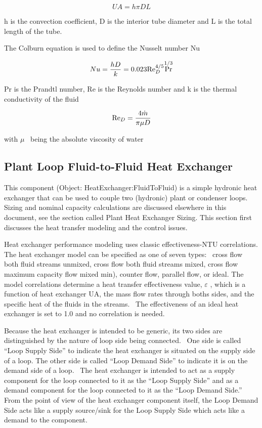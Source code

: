 \begin{equation}
UA = h\pi DL
\end{equation}

h is the convection coefficient, D is the interior tube diameter and L is the total length of the tube.

The Colburn equation is used to define the Nusselt number Nu

\begin{equation}
Nu = \frac{{hD}}{k} = 0.023{\mathop{\rm Re}\nolimits} {{}_D^{4/5}}{\Pr ^{1/3}}
\end{equation}

Pr is the Prandtl number, Re is the Reynolds number and k is the thermal conductivity of the fluid

\begin{equation}
{\mathop{\rm Re}\nolimits} {}_D = \frac{{4\dot m}}{{\pi \mu D}}
\end{equation}

with \(\mu\) ~being the absolute viscosity of water

\subsection{Plant Loop Fluid-to-Fluid Heat Exchanger}\label{plant-loop-fluid-to-fluid-heat-exchanger}

This component (Object: HeatExchanger:FluidToFluid) is a simple hydronic heat exchanger that can be used to couple two (hydronic) plant or condenser loops.~ Sizing and nominal capacity calculations are discussed elsewhere in this document, see the section called Plant Heat Exchanger Sizing. This section first discusses the heat transfer modeling and the control issues.

Heat exchanger performance modeling uses classic effectiveness-NTU correlations. The heat exchanger model can be specified as one of seven types: ~cross flow both fluid streams unmixed, cross flow both fluid streams mixed, cross flow maximum capacity flow mixed min), counter flow, parallel flow, or ideal. The model correlations determine a heat transfer effectiveness value, \(\varepsilon\) , which is a function of heat exchanger UA, the mass flow rates through boths sides, and the specific heat of the fluids in the streams.~ The effectiveness of an ideal heat exchanger is set to 1.0 and no correlation is needed.

Because the heat exchanger is intended to be generic, its two sides are distinguished by the nature of loop side being connected.~ One side is called ``Loop Supply Side'' to indicate the heat exchanger is situated on the supply side of a loop. The other side is called ``Loop Demand Side'' to indicate it is on the demand side of a loop.~ The heat exchanger is intended to act as a supply component for the loop connected to it as the ``Loop Supply Side'' and as a demand component for the loop connected to it as the ``Loop Demand Side.''~ From the point of view of the heat exchanger component itself, the Loop Demand Side acts like a supply source/sink for the Loop Supply Side which acts like a demand to the component.

